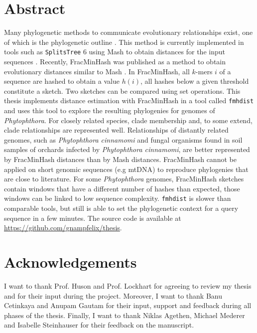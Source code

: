 
\section*{Abstract}
Many phylogenetic methods to communicate evolutionary relationships exist, one
of which is the phylogenetic outline
\cite{bagciMicrobialPhylogeneticContext2021}. This method is currently
implemented in tools such as \texttt{SplitsTree} 6
\cite{husonApplicationPhylogeneticNetworks2006} using Mash to obtain distances
for the input sequences \cite{ondovMashFastGenome2016}. Recently, FracMinHash
was published as a method to obtain evolutionary distances similar to Mash
\cite{irberLightweightCompositionalAnalysis2022}. In FracMinHash, all $k$-mers
$i$ of a sequence are hashed to obtain a value $h(i)$, all hashes below a given
threshold constitute a sketch. Two sketches can be compared using set
operations. This thesis implements distance estimation with FracMinHash in a
tool called \texttt{fmhdist} and uses this tool to explore the resulting
phylogenies for genomes of \textit{Phytophthora}. For closely related species,
clade membership and, to some extend, clade relationships are represented well.
Relationships of distantly related genomes, such as \textit{Phytophthora
cinnamomi} and fungal organisms found in soil samples of orchards infected by
\textit{Phytophthora cinnamomi}, are better represented by FracMinHash distances
than by Mash distances. FracMinHash cannot be applied on short genomic sequences
(e.g mtDNA) to reproduce phylogenies that are close to literature. For some
\textit{Phytophthora} genomes, FracMinHash sketches contain windows that have a
different number of hashes than expected, those windows can be linked to low
sequence complexity. \texttt{fmhdist} is slower than comparable tools, but still
is able to set the phylogenetic context
\cite{bagciMicrobialPhylogeneticContext2021} for a query sequence in a few
minutes. The source code is available at
\url{https://github.com/gnampfelix/thesis}.
\newpage


\section*{Acknowledgements}
I want to thank Prof. Huson and Prof. Lockhart for agreeing to review my thesis
and for their input during the project. Moreover, I want to thank Banu Cetinkaya
and Anupam Gautam for their input, support and feedback during all phases of the
thesis. Finally, I want to thank Niklas Agethen, Michael Mederer and Isabelle
Steinhauser for their feedback on the manuscript.